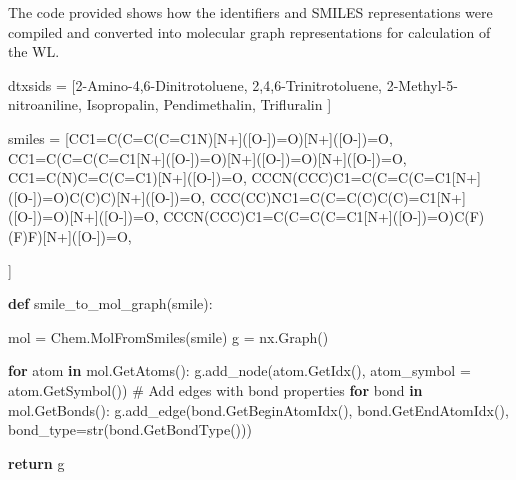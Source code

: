 \documentclass[
  super,
  preprint,
  3p]{elsarticle}
\newenvironment{Shaded}{\begin{snugshade}}{\end{snugshade}}
\newcommand{\BuiltInTok}[1]{\textcolor[rgb]{0.00,0.23,0.31}{#1}}
\newcommand{\CommentTok}[1]{\textcolor[rgb]{0.37,0.37,0.37}{#1}}
\newcommand{\ControlFlowTok}[1]{\textcolor[rgb]{0.00,0.23,0.31}{\textbf{#1}}}
\newcommand{\KeywordTok}[1]{\textcolor[rgb]{0.00,0.23,0.31}{\textbf{#1}}}
\newcommand{\NormalTok}[1]{\textcolor[rgb]{0.00,0.23,0.31}{#1}}
\newcommand{\OperatorTok}[1]{\textcolor[rgb]{0.37,0.37,0.37}{#1}}
\newcommand{\StringTok}[1]{\textcolor[rgb]{0.13,0.47,0.30}{#1}}
\begin{document}
The code provided shows how the identifiers and SMILES representations
were compiled and converted into molecular graph representations for
calculation of the WL.

\begin{Shaded}
\begin{Highlighting}[]
\NormalTok{dtxsids }\OperatorTok{=}\NormalTok{ [}\StringTok{\textquotesingle{}2{-}Amino{-}4,6{-}Dinitrotoluene\textquotesingle{}}\NormalTok{,}
\StringTok{\textquotesingle{}2,4,6{-}Trinitrotoluene\textquotesingle{}}\NormalTok{,}
\StringTok{\textquotesingle{}2{-}Methyl{-}5{-}nitroaniline\textquotesingle{}}\NormalTok{,}
\StringTok{\textquotesingle{}Isopropalin\textquotesingle{}}\NormalTok{,}
\StringTok{\textquotesingle{}Pendimethalin\textquotesingle{}}\NormalTok{,}
\StringTok{\textquotesingle{}Trifluralin\textquotesingle{}}
\NormalTok{]}

\NormalTok{smiles }\OperatorTok{=}\NormalTok{ [}\StringTok{\textquotesingle{}CC1=C(C=C(C=C1N)[N+]([O{-}])=O)[N+]([O{-}])=O\textquotesingle{}}\NormalTok{,}
\StringTok{\textquotesingle{}CC1=C(C=C(C=C1[N+]([O{-}])=O)[N+]([O{-}])=O)[N+]([O{-}])=O\textquotesingle{}}\NormalTok{,}
\StringTok{\textquotesingle{}CC1=C(N)C=C(C=C1)[N+]([O{-}])=O\textquotesingle{}}\NormalTok{,}
\StringTok{\textquotesingle{}CCCN(CCC)C1=C(C=C(C=C1[N+]([O{-}])=O)C(C)C)[N+]([O{-}])=O\textquotesingle{}}\NormalTok{,}
\StringTok{\textquotesingle{}CCC(CC)NC1=C(C=C(C)C(C)=C1[N+]([O{-}])=O)[N+]([O{-}])=O\textquotesingle{}}\NormalTok{,}
\StringTok{\textquotesingle{}CCCN(CCC)C1=C(C=C(C=C1[N+]([O{-}])=O)C(F)(F)F)[N+]([O{-}])=O\textquotesingle{}}\NormalTok{,}

\NormalTok{]}
\end{Highlighting}
\end{Shaded}

\begin{Shaded}
\begin{Highlighting}[]
\KeywordTok{def}\NormalTok{ smile\_to\_mol\_graph(smile):}

\NormalTok{    mol }\OperatorTok{=}\NormalTok{ Chem.MolFromSmiles(smile)}
\NormalTok{    g }\OperatorTok{=}\NormalTok{ nx.Graph()}

    \ControlFlowTok{for}\NormalTok{ atom }\KeywordTok{in}\NormalTok{ mol.GetAtoms():}
\NormalTok{        g.add\_node(atom.GetIdx(),}
\NormalTok{                   atom\_symbol }\OperatorTok{=}\NormalTok{ atom.GetSymbol())}
    \CommentTok{\# Add edges with bond properties}
    \ControlFlowTok{for}\NormalTok{ bond }\KeywordTok{in}\NormalTok{ mol.GetBonds():}
\NormalTok{        g.add\_edge(bond.GetBeginAtomIdx(), }
\NormalTok{                   bond.GetEndAtomIdx(), }
\NormalTok{                   bond\_type}\OperatorTok{=}\BuiltInTok{str}\NormalTok{(bond.GetBondType()))}

    
    \ControlFlowTok{return}\NormalTok{ g}
\end{Highlighting}
\end{Shaded}
\end{document}
